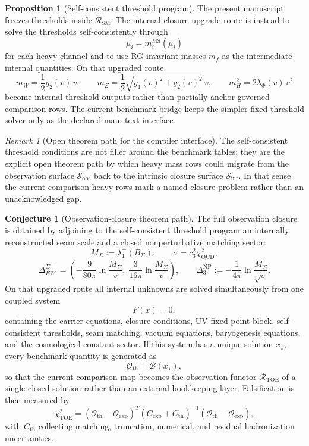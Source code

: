 \documentclass[11pt,a4paper]{article}
\theoremstyle{definition}
\newtheorem{conjecture}[theorem]{Conjecture}
\newtheorem{proposition}[theorem]{Proposition}
\theoremstyle{remark}
\newtheorem*{remark}{Remark}
\newcommand{\cthree}{c_3}
\newcommand{\SM}{\mathrm{SM}}
\newcommand{\QCD}{\mathrm{QCD}}
\begin{document}
\begin{proposition}[Self-consistent threshold program]
The present manuscript freezes thresholds inside $\mathcal R_{\SM}$. The internal closure-upgrade route is instead to solve the thresholds self-consistently through
\[
\mu_i=m_i^{\overline{\mathrm{MS}}}(\mu_i)
\]
for each heavy channel and to use RG-invariant masses $\hat m_f$ as the intermediate internal quantities. On that upgraded route,
\[
m_W=\frac12 g_2(v)\,v,
\qquad
m_Z=\frac12\sqrt{g_1(v)^2+g_2(v)^2}\,v,
\qquad
m_H^2=2\lambda_\Phi(v)\,v^2
\]
become internal threshold outputs rather than partially anchor-governed comparison rows. The current benchmark bridge keeps the simpler fixed-threshold solver only as the declared main-text interface.
\end{proposition}

\begin{remark}[Open theorem path for the compiler interface]
The self-consistent threshold conditions are not filler around the benchmark tables; they are the explicit open theorem path by which heavy mass rows could migrate from the observation surface $\mathcal S_{\mathrm{obs}}$ back to the intrinsic closure surface $\mathcal S_{\mathrm{int}}$. In that sense the current comparison-heavy rows mark a named closure problem rather than an unacknowledged gap.
\end{remark}

\begin{conjecture}[Observation-closure theorem path]
The full observation closure is obtained by adjoining to the self-consistent
threshold program an internally reconstructed seam scale and a closed
nonperturbative matching sector:
\[
M_\Sigma:=\lambda_1^+(B_\Sigma),
\qquad
\sigma=\cthree^2\chi_{\QCD}^2,
\]
\[
\Delta_{EW}^{\Sigma,+}
=
\left(
-\frac{9}{80\pi}\ln\frac{M_\Sigma}{v},
\;
\frac{3}{16\pi}\ln\frac{M_\Sigma}{v}
\right),
\qquad
\Delta_3^{\mathrm{NP}}
:=
-\frac{1}{4\pi}\ln\frac{M_\Sigma}{\sqrt{\sigma}}.
\]
On that upgraded route all internal unknowns are solved simultaneously from one
coupled system
\[
F(x)=0,
\]
containing the carrier equations, closure conditions, UV fixed-point block,
self-consistent thresholds, seam matching, vacuum equations, baryogenesis
equations, and the cosmological-constant sector. If this system has a unique
solution $x_\star$, every benchmark quantity is generated as
\[
\mathcal O_{\mathrm{th}}=\mathcal B(x_\star),
\]
so that the current comparison map becomes the observation functor
$\mathcal R_{\mathrm{TOE}}$ of a single closed solution rather than an external
bookkeeping layer. Falsification is then measured by
\[
\chi^2_{\mathrm{TOE}}
=
(\mathcal O_{\mathrm{th}}-\mathcal O_{\mathrm{exp}})^T
(C_{\mathrm{exp}}+C_{\mathrm{th}})^{-1}
(\mathcal O_{\mathrm{th}}-\mathcal O_{\mathrm{exp}}),
\]
with $C_{\mathrm{th}}$ collecting matching, truncation, numerical, and residual
hadronization uncertainties.
\end{conjecture}
\end{document}
